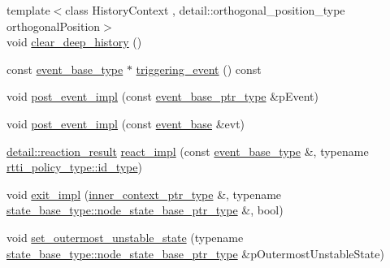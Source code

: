 \begin{DoxyCompactItemize}
\item 
{\footnotesize template$<$class History\+Context , detail\+::orthogonal\+\_\+position\+\_\+type orthogonal\+Position$>$ }\\void \mbox{\hyperlink{classboost_1_1statechart_1_1state__machine_a5b60164ba8ab165421fad2ecbccad4e8}{clear\+\_\+deep\+\_\+history}} ()
\item 
const \mbox{\hyperlink{classboost_1_1statechart_1_1state__machine_adb0e98d6d780a0977209fa7389b20bcd}{event\+\_\+base\+\_\+type}} $\ast$ \mbox{\hyperlink{classboost_1_1statechart_1_1state__machine_afe07725d4e0977f598d3747679cf64ca}{triggering\+\_\+event}} () const
\item 
void \mbox{\hyperlink{classboost_1_1statechart_1_1state__machine_ac2e9c9c0d773811364289ae11d21f0fc}{post\+\_\+event\+\_\+impl}} (const \mbox{\hyperlink{classboost_1_1statechart_1_1state__machine_aa2f1c567e2d1a66786d28769312dfa08}{event\+\_\+base\+\_\+ptr\+\_\+type}} \&p\+Event)
\item 
void \mbox{\hyperlink{classboost_1_1statechart_1_1state__machine_a1c2de8cd216efdafba64c256ed2c958c}{post\+\_\+event\+\_\+impl}} (const \mbox{\hyperlink{classboost_1_1statechart_1_1event__base}{event\+\_\+base}} \&evt)
\item 
\mbox{\hyperlink{namespaceboost_1_1statechart_1_1detail_ab091bbb4c29327fb46ee479ea1b7255b}{detail\+::reaction\+\_\+result}} \mbox{\hyperlink{classboost_1_1statechart_1_1state__machine_ade128c9521e56191502b711f15b438cd}{react\+\_\+impl}} (const \mbox{\hyperlink{classboost_1_1statechart_1_1state__machine_adb0e98d6d780a0977209fa7389b20bcd}{event\+\_\+base\+\_\+type}} \&, typename \mbox{\hyperlink{structboost_1_1statechart_1_1detail_1_1rtti__policy_a57d56a3531686fb2b92d733b5da620c2}{rtti\+\_\+policy\+\_\+type\+::id\+\_\+type}})
\item 
void \mbox{\hyperlink{classboost_1_1statechart_1_1state__machine_a9486745c6ec90b852dc30c3bbcade535}{exit\+\_\+impl}} (\mbox{\hyperlink{classboost_1_1statechart_1_1state__machine_a9943ccf227161502104d8843521b6131}{inner\+\_\+context\+\_\+ptr\+\_\+type}} \&, typename \mbox{\hyperlink{classboost_1_1statechart_1_1detail_1_1state__base_a8e3dd0f80bf95d7df21417a50f1dbaa1}{state\+\_\+base\+\_\+type\+::node\+\_\+state\+\_\+base\+\_\+ptr\+\_\+type}} \&, bool)
\item 
void \mbox{\hyperlink{classboost_1_1statechart_1_1state__machine_a986877a10c5bbba4fabdd398893f8bda}{set\+\_\+outermost\+\_\+unstable\+\_\+state}} (typename \mbox{\hyperlink{classboost_1_1statechart_1_1detail_1_1state__base_a8e3dd0f80bf95d7df21417a50f1dbaa1}{state\+\_\+base\+\_\+type\+::node\+\_\+state\+\_\+base\+\_\+ptr\+\_\+type}} \&p\+Outermost\+Unstable\+State)

\end{DoxyCompactItemize}
